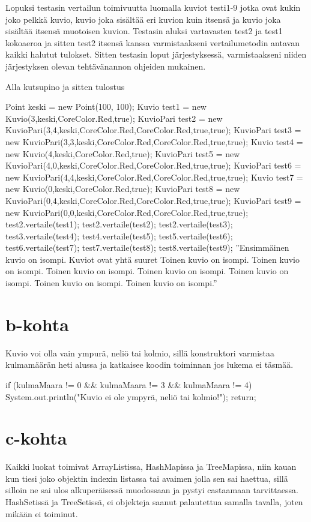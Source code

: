 Lopuksi testasin vertailun toimivuutta luomalla kuviot testi1-9 jotka ovat kukin
joko pelkkä kuvio, kuvio joka sisältää eri kuvion kuin itsensä ja kuvio joka sisältää
itsensä muotoisen kuvion. Testasin aluksi vartavasten test2 ja test1 kokoaeroa ja
sitten test2 itsensä kanssa varmistaakseni vertailumetodin antavan kaikki halutut
tulokset. Sitten testasin loput järjestyksessä, varmistaakseni niiden järjestyksen
olevan tehtävänannon ohjeiden mukainen.

Alla kutsupino ja sitten tulostus
\begin{javacode}
      Point keski = new Point(100, 100);
      Kuvio test1 = new Kuvio(3,keski,CoreColor.Red,true);
      KuvioPari test2 = new KuvioPari(3,4,keski,CoreColor.Red,CoreColor.Red,true,true);
      KuvioPari test3 = new KuvioPari(3,3,keski,CoreColor.Red,CoreColor.Red,true,true);
      Kuvio test4 = new Kuvio(4,keski,CoreColor.Red,true);
      KuvioPari test5 = new KuvioPari(4,0,keski,CoreColor.Red,CoreColor.Red,true,true);
      KuvioPari test6 = new KuvioPari(4,4,keski,CoreColor.Red,CoreColor.Red,true,true);
      Kuvio test7 = new Kuvio(0,keski,CoreColor.Red,true);
      KuvioPari test8 = new KuvioPari(0,4,keski,CoreColor.Red,CoreColor.Red,true,true);
      KuvioPari test9 = new KuvioPari(0,0,keski,CoreColor.Red,CoreColor.Red,true,true);
      test2.vertaile(test1);
      test2.vertaile(test2);
      test2.vertaile(test3);
      test3.vertaile(test4);
      test4.vertaile(test5);
      test5.vertaile(test6);
      test6.vertaile(test7);
      test7.vertaile(test8);
      test8.vertaile(test9);
''Ensimmäinen kuvio on isompi.
  Kuviot ovat yhtä suuret
  Toinen kuvio on isompi.
  Toinen kuvio on isompi.
  Toinen kuvio on isompi.
  Toinen kuvio on isompi.
  Toinen kuvio on isompi.
  Toinen kuvio on isompi.
  Toinen kuvio on isompi.''
\end{javacode}

\section{b-kohta}
\label{b-kohta}
Kuvio voi olla vain ympurä, neliö tai kolmio, sillä konstruktori varmistaa
kulmamäärän heti alussa ja katkaisee koodin toiminnan jos lukema ei täsmää.
\begin{javacode}
    if (kulmaMaara != 0 && kulmaMaara != 3 && kulmaMaara != 4) {
      System.out.println("Kuvio ei ole ympyrä, neliö tai kolmio!");
      return;
    }
\end{javacode}

\section{c-kohta}
\label{c-kohta}
Kaikki luokat toimivat ArrayListissa, HashMapissa ja TreeMapissa, niin kauan kun tiesi
joko objektin indexin listassa tai avaimen jolla sen sai haettua, sillä silloin ne sai
ulos alkuperäisessä muodossaan ja pystyi castaamaan tarvittaessa. HashSetissä ja
TreeSetissä, ei objekteja saanut palautettua samalla tavalla, joten mikään ei toiminut.

